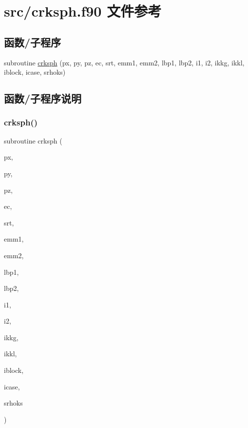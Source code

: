 \hypertarget{crksph_8f90}{}\section{src/crksph.f90 文件参考}
\label{crksph_8f90}
\subsection*{函数/子程序}
\begin{DoxyCompactItemize}
\item 
subroutine \mbox{\hyperlink{crksph_8f90_abab9ec0d6f0ca2ddb98e9f7d00ffb425}{crksph}} (px, py, pz, ec, srt, emm1, emm2, lbp1, lbp2, i1, i2, ikkg, ikkl, iblock, icase, srhoks)
\end{DoxyCompactItemize}


\subsection{函数/子程序说明}
\mbox{\label{crksph_8f90_abab9ec0d6f0ca2ddb98e9f7d00ffb425}} 
\subsubsection{\texorpdfstring{crksph()}{crksph()}}
{\footnotesize\ttfamily subroutine crksph (\begin{DoxyParamCaption}\item[{}]{px,  }\item[{}]{py,  }\item[{}]{pz,  }\item[{}]{ec,  }\item[{}]{srt,  }\item[{}]{emm1,  }\item[{}]{emm2,  }\item[{}]{lbp1,  }\item[{}]{lbp2,  }\item[{}]{i1,  }\item[{}]{i2,  }\item[{}]{ikkg,  }\item[{}]{ikkl,  }\item[{}]{iblock,  }\item[{}]{icase,  }\item[{}]{srhoks }\end{DoxyParamCaption})}



